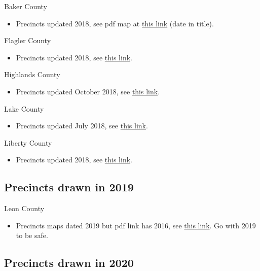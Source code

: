 \documentclass[12pt]{article}
\begin{document}
Baker County
\begin{itemize}
  \item Precincts updated 2018, see pdf map at \href{https://www.bakerelections.com/Portals/Baker/Documents/Precinct%20Map%202018.pdf}{this link} (date in title).
\end{itemize}
Flagler County
\begin{itemize}
  \item Precincts updated 2018, see \href{https://www.flaglerelections.com/For-Voters/District-Precinct-Maps}{this link}.
\end{itemize}
Highlands County
\begin{itemize}
  \item Precincts updated October 2018, see \href{https://www.votehighlands.com/Portals/Highlands/Documents/2018%20Precincts%20Map_092818.pdf?ver=2018-10-16-131000-593}{this link}.
\end{itemize}
Lake County
\begin{itemize}
  \item Precincts updated July 2018, see \href{https://www.lakecountyfl.gov/pdfs/gis/maps/VotingPrecincts_34x44-ADA.pdf}{this link}.
\end{itemize}
Liberty County
\begin{itemize}
  \item Precincts updated 2018, see \href{http://www.libertycad.com/wp-content/uploads/2018/11/2018-VP-MAP.pdf}{this link}.
\end{itemize}


\clearpage

\subsection{Precincts drawn in 2019}
Leon County
\begin{itemize}
  \item Precincts maps dated 2019 but pdf link has 2016, see \href{https://www.leonvotes.org/Portals/Leon/Documents/Maps_and%20Demographics/Pdfs/2016/Pct_Mapbook_2016.pdf}{this link}. Go with 2019 to be safe.
\end{itemize}

\clearpage

\subsection{Precincts drawn in 2020}
\end{document}
